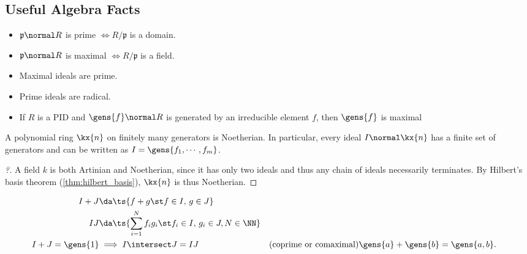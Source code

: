\hypertarget{useful-algebra-facts}{%
\subsection{Useful Algebra Facts}\label{useful-algebra-facts}}

\begin{fact}

\envlist

\begin{itemize}
\tightlist
\item
  \(\mathfrak{p}\normal R\) is prime \(\iff R/\mathfrak{p}\) is a
  domain.
\item
  \(\mathfrak{p}\normal R\) is maximal \(\iff R/\mathfrak{p}\) is a
  field.
\item
  Maximal ideals are prime.
\item
  Prime ideals are radical.
\item
  If \(R\) is a PID and \(\gens{f} \normal R\) is generated by an
  irreducible element \(f\), then \(\gens{f}\) is maximal
\end{itemize}

\end{fact}

\begin{proposition}

A polynomial ring \(\kx{n}\) on finitely many generators is Noetherian.
In particular, every ideal \(I\normal \kx{n}\) has a finite set of
generators and can be written as \(I = \gens{f_1, \cdots, f_m}\).

\end{proposition}

\begin{proof}[?]

A field \(k\) is both Artinian and Noetherian, since it has only two
ideals and thus any chain of ideals necessarily terminates. By Hilbert's
basis theorem (\cref{thm:hilbert_basis}), \(\kx{n}\) is thus Noetherian.

\end{proof}

\begin{proposition}

\begin{align*}  
I+J   &\da \ts{f+g \st f\in I,\, g\in J} \\
IJ    &\da \ts{\sum_{i=1}^N f_i g_i \st f_i\in I,\, g_i\in J, N\in \NN} \\
I+J   = \gens{1} 
      &\implies I\intersect J = IJ && \text{(coprime or comaximal)}
\gens{a} + \gens{b} = \gens{a, b}
.\end{align*}

\end{proposition}

